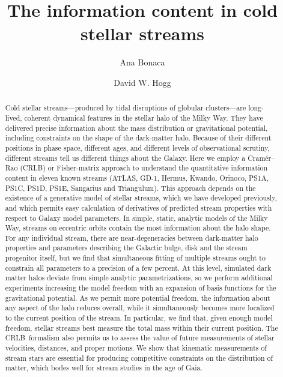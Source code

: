 \documentclass[modern]{aastex61}
\newcommand{\acronym}[1]{{\small{#1}}}
\newcommand{\CRLB}{\acronym{CRLB}}
\begin{document}
\sloppy\sloppypar\raggedbottom\frenchspacing %

\title{The information content in cold stellar streams}


\author[0000-0002-7846-9787]{Ana Bonaca}

\author[0000-0003-2866-9403]{David W. Hogg}

\begin{abstract}\noindent %
Cold stellar streams---produced by tidal disruptions of globular clusters---are long-lived, coherent dynamical features in the stellar halo of the Milky Way.
They have delivered precise information about the mass distribution or gravitational potential, including constraints on the shape of the dark-matter halo.
Because of their different positions in phase space, different ages, and different levels of observational scrutiny, different streams tell us different things about the Galaxy.
Here we employ a Cram\'er--Rao (\CRLB) or Fisher-matrix approach to understand the quantitative information content in eleven known streams (ATLAS, GD-1, Hermus, Kwando, Orinoco, PS1A, PS1C, PS1D, PS1E, Sangarius and Triangulum).
This approach depends on the existence of a generative model of stellar streams, which we have developed previously, and which permits easy calculation of derivatives of predicted stream properties with respect to Galaxy model parameters.
In simple, static, analytic models of the Milky Way, streams on eccentric orbits contain the most information about the halo shape.
For any individual stream, there are near-degeneracies between dark-matter halo properties and parameters describing the Galactic bulge, disk and the stream progenitor itself, but we find that simultaneous fitting of multiple streams ought to constrain all parameters to a precision of a few percent.
At this level, simulated dark matter halos deviate from simple analytic parametrizations, so we perform additional experiments increasing the model freedom with an expansion of basis functions for the gravitational potential.
As we permit more potential freedom, the information about any aspect of the halo reduces overall, while it simultaneously becomes more localized to the current position of the stream.
In particular, we find that, given enough model freedom, stellar streams best measure the total mass within their current position.
The \CRLB\ formalism also permits us to assess the value of future measurements of stellar velocities, distances, and proper motions.
We show that kinematic measurements of stream stars are essential for producing competitive constraints on the distribution of matter, which bodes well for stream studies in the age of Gaia.


\end{abstract}
\end{document}
